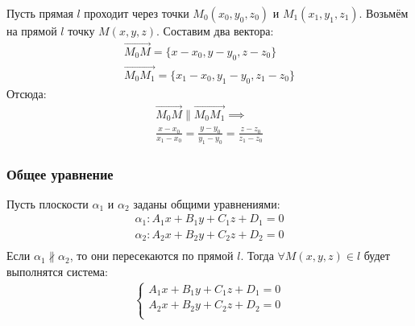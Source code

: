 Пусть прямая $l$ проходит через точки $M_0(x_0, y_0, z_0)$ и $M_1(x_1, y_1, z_1)$.
Возьмём на прямой $l$ точку  $M(x, y, z)$.
Составим два вектора:
\begin{gather*}
  \overrightarrow{M_0M} = \{x - x_0, y - y_0, z - z_0\} \\ 
  \overrightarrow{M_0M_1} = \{x_1 - x_0, y_1 - y_0, z_1 - z_0\}
\end{gather*}
Отсюда:
\begin{gather*}
  \overrightarrow{M_0M} \parallel  \overrightarrow{M_0M_1} \implies \\
  \boxed{
    \frac{x - x_0}{x_1 - x_0} = \frac{y - y_0}{y_1 - y_0} = \frac{z - z_0}{z_1 - z_0}
  }
\end{gather*}

\subsubsection{Общее уравнение}

Пусть плоскости $\alpha_1$ и $\alpha_2$ заданы общими уравнениями:
\begin{gather*}
  \alpha_1: A_1x + B_1y + C_1z + D_1 = 0 \\
  \alpha_2: A_2x + B_2y + C_2z + D_2 = 0 \\
\end{gather*}
Если $\alpha_1 \not \parallel \alpha_2$, то они пересекаются по прямой $l$.
Тогда $\forall M(x, y, z) \in l$ будет выполнятся система:
\begin{gather*}
  \boxed{
    \begin{cases}
      A_1x + B_1y + C_1z + D_1 = 0 \\
      A_2x + B_2y + C_2z + D_2 = 0 \\
    \end{cases}
  }
\end{gather*}


